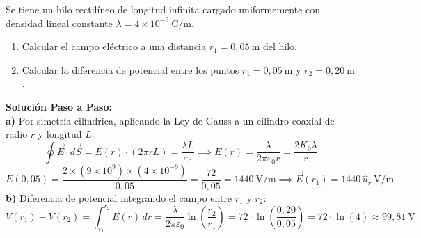 \begin{ejercicio}
Se tiene un hilo rectilíneo de longitud infinita cargado uniformemente con densidad lineal constante $\lambda = 4 \times 10^{-9}\ \si{\coulomb\per\meter}$.
\begin{enumerate}[label=\alph*)]
    \item Calcular el campo eléctrico a una distancia $r_1 = 0{,}05\ \si{\meter}$ del hilo.
    \item Calcular la diferencia de potencial entre los puntos $r_1 = 0{,}05\ \si{\meter}$ y $r_2 = 0{,}20\ \si{\meter}$.
\end{enumerate}
\tcbline
\begin{center}
\end{center}
\textbf{Solución Paso a Paso:}\\[4pt]
\textbf{a)} Por simetría cilíndrica, aplicando la Ley de Gauss a un cilindro coaxial de radio $r$ y longitud $L$:
\begin{equation}
    \oint \vec{E}\cdot d\vec{S} = E(r) \cdot (2\pi r L) = \frac{\lambda L}{\varepsilon_0} \implies E(r) = \frac{\lambda}{2\pi\varepsilon_0 r} = \frac{2 K_0 \lambda}{r}
\end{equation}
\begin{equation}
    E(0{,}05) = \frac{2 \times (9 \times 10^9) \times (4 \times 10^{-9})}{0{,}05} = \frac{72}{0{,}05} = 1440\ \si{\volt\per\meter} \implies \vec{E}(r_1) = 1440\, \hat{u}_r\ \si{\volt\per\meter}
\end{equation}
\textbf{b)} Diferencia de potencial integrando el campo entre $r_1$ y $r_2$:
\begin{equation}
    V(r_1) - V(r_2) = \int_{r_1}^{r_2} E(r)\, dr = \frac{\lambda}{2\pi\varepsilon_0} \ln\left(\frac{r_2}{r_1}\right) = 72 \cdot \ln\left(\frac{0{,}20}{0{,}05}\right) = 72 \cdot \ln(4) \approx 99{,}81\ \si{\volt}
\end{equation}
\end{ejercicio}

